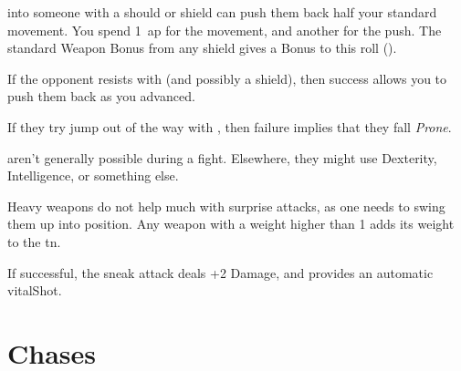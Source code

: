 \begin{multicols}{2}
into someone with a should or shield can push them back half your standard movement.
You spend 1~\gls{ap} for the movement, and another for the push.
The standard Weapon Bonus from any shield gives a Bonus to this roll ().

If the opponent resists with  (and possibly a shield), then success allows you to push them back as you advanced.

If they try jump out of the way with , then failure implies that they fall \textit{Prone}.

\label{sneakattack}
aren't generally possible during a fight.
Elsewhere, they might use Dexterity, Intelligence, or something else.

Heavy weapons do not help much with surprise attacks, as one needs to swing them up into position.
Any weapon with a \gls{weight} higher than 1 adds its \gls{weight} to the \gls{tn}.

If successful, the sneak attack deals +2 Damage, and provides an automatic \gls{vitalShot}.

\stopcontents[Manoeuvres]

\end{multicols}

\section{Chases}
\label{chases}

\chasechart

